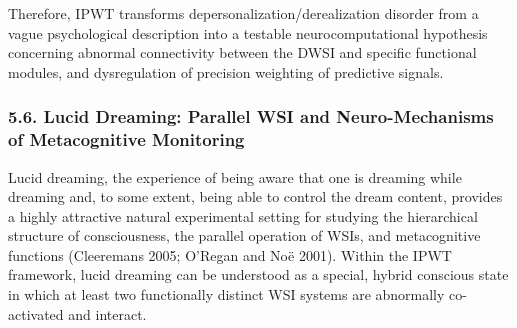 \documentclass[
  a4paper]{article}
\begin{document}
Therefore, IPWT transforms depersonalization/derealization disorder from
a vague psychological description into a testable neurocomputational
hypothesis concerning abnormal connectivity between the DWSI and
specific functional modules, and dysregulation of precision weighting of
predictive signals.

\subsubsection{5.6. Lucid Dreaming: Parallel WSI and Neuro-Mechanisms of
Metacognitive
Monitoring}\label{lucid-dreaming-parallel-wsi-and-neuro-mechanisms-of-metacognitive-monitoring}

Lucid dreaming, the experience of being aware that one is dreaming while
dreaming and, to some extent, being able to control the dream content,
provides a highly attractive natural experimental setting for studying
the hierarchical structure of consciousness, the parallel operation of
WSIs, and metacognitive functions (Cleeremans 2005; O'Regan and Noë
2001). Within the IPWT framework, lucid dreaming can be understood as a
special, hybrid conscious state in which at least two functionally
distinct WSI systems are abnormally co-activated and interact.
\end{document}

